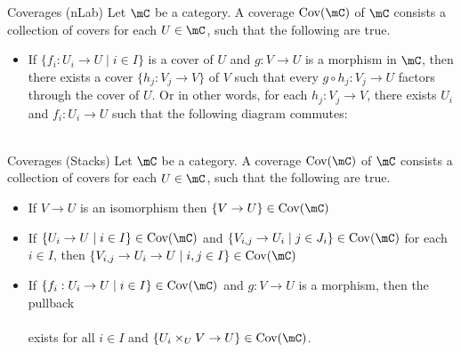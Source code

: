 \documentclass[a4paper]{article}
\begin{document}
\begin{defn}{Coverages (nLab)}{} Let $\mC$ be a category. A coverage $\text{Cov}(\mC)$ of $\mC$ consists a collection of covers for each $U\in\mC$, such that the following are true. 
\begin{itemize}
\item If $\{f_i:U_i\to U\;|\;i\in I\}$ is a cover of $U$ and $g:V\to U$ is a morphism in $\mC$, then there exists a cover $\{h_j:V_j\to V\}$ of $V$ such that every $g\circ h_j:V_j\to U$ factors through the cover of $U$. Or in other words, for each $h_j:V_j\to V$, there exists $U_i$ and $f_i:U_i\to U$ such that the following diagram commutes: \\
\\
\end{itemize}
\end{defn}

\begin{defn}{Coverages (Stacks)}{} Let $\mC$ be a category. A coverage $\text{Cov}(\mC)$ of $\mC$ consists a collection of covers for each $U\in\mC$, such that the following are true. 
\begin{itemize}
\item If $V\to U$ is an isomorphism then $\{V\to U\}\in\text{Cov}(\mC)$
\item If $\{U_i\to U\;|\;i\in I\}\in\text{Cov}(\mC)$ and $\{V_{i,j}\to U_i\;|\;j\in J_i\}\in\text{Cov}(\mC)$ for each $i\in I$, then $\{V_{i,j}\to U_i\to U\;|\;i,j\in I\}\in\text{Cov}(\mC)$
\item If $\{f_i:U_i\to U\;|\;i\in I\}\in\text{Cov}(\mC)$ and $g:V\to U$ is a morphism, then the pullback \\
\\
exists for all $i\in I$ and $\{U_i\times_UV\to U\}\in\text{Cov}(\mC)$. 
\end{itemize}
\end{defn}
\end{document}
